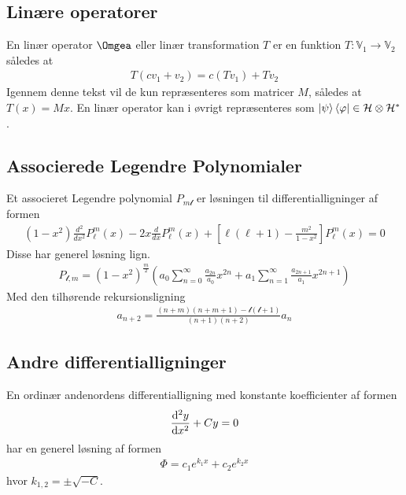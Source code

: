\documentclass[12pt]{article}
\theoremstyle{definition}
\theoremstyle{remark}
\theoremstyle{definition}
\numberwithin{equation}{section}
\begin{document}
\subsection{Linære operatorer}

En linær operator $\Omgea$ eller linær transformation $T$ er en
funktion $T:\mathbb V_1 \to \mathbb V_2$ således at
\begin{align}
  \label{eq:2}
  T(cv_1+v_2) = c(Tv_1) + Tv_2
\end{align}
Igennem denne tekst vil de kun repræsenteres som matricer $M$, således
at $T(x)=Mx$. En linær operator kan i øvrigt repræsenteres som $\ket
\psi \bra \varphi \in \mathcal H \otimes \mathcal H^*$ \parencite{kunze}.

\subsection{Associerede Legendre Polynomialer}
Et associeret Legendre polynomial $P_{m\mathscr l}$ er løsningen til differentialligninger af formen
\begin{align}
    \label{legendrede}
    (1 - x^2) \frac{d^2}{d x^2} P_\ell^m(x) - 2 x \frac{d}{d x} P_\ell^m(x) + \left[ \ell (\ell + 1) - \frac{m^2}{1 - x^2} \right] P_\ell^m(x) = 0
\end{align}
Disse har generel løsning lign. \parencite{courant1953methods}
\begin{align}
    \label{legpoly}
    P_{\mathscr l,m}=(1-x^2)^{\frac{m}{2}}\left(a_0\sum_{n=0}^{\infty}\frac{a_{2n}}{a_0}x^{2n}+a_1\sum_{n=1}^{\infty}\frac{a_{2n+1}}{a_1}x^{2n+1}\right)
\end{align}
Med den tilhørende rekursionsligning
\begin{align}
    a_{n+2}=\frac{(n+m)(n+m+1)-\mathscr l(\mathscr l+1)}{(n+1)(n+2)}a_n
\end{align}

\subsection{Andre differentialligninger}
En ordinær andenordens differentialligning med konstante koefficienter af formen
\begin{align}
\label{constantodewithcoefficients}
    \frac{{\rm d}^2y}{{\rm d}x^2}+Cy=0
\end{align}
har en generel løsning af formen \parencite[492]{riley}
\begin{align}
    \Phi = c_1e^{k_1x}+c_2e^{k_2x}
\end{align}
hvor $k_{1,2}=\pm\sqrt{-C}$.
\end{document}
